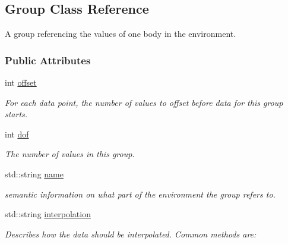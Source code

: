 \hypertarget{classOpenRAVE_1_1ConfigurationSpecification_1_1Group}{
\subsection{Group Class Reference}
\label{classOpenRAVE_1_1ConfigurationSpecification_1_1Group}
}


A group referencing the values of one body in the environment.  


\subsubsection*{Public Attributes}
\begin{DoxyCompactItemize}
\item 
\hypertarget{classOpenRAVE_1_1ConfigurationSpecification_1_1Group_aed7ea92f45bd273dde380a45ddced592}{
int \hyperlink{classOpenRAVE_1_1ConfigurationSpecification_1_1Group_aed7ea92f45bd273dde380a45ddced592}{offset}}
\label{classOpenRAVE_1_1ConfigurationSpecification_1_1Group_aed7ea92f45bd273dde380a45ddced592}

\begin{DoxyCompactList}\small\item\em For each data point, the number of values to offset before data for this group starts. \item\end{DoxyCompactList}\item 
\hypertarget{classOpenRAVE_1_1ConfigurationSpecification_1_1Group_a03745287ca42590ead4a18807041fc66}{
int \hyperlink{classOpenRAVE_1_1ConfigurationSpecification_1_1Group_a03745287ca42590ead4a18807041fc66}{dof}}
\label{classOpenRAVE_1_1ConfigurationSpecification_1_1Group_a03745287ca42590ead4a18807041fc66}

\begin{DoxyCompactList}\small\item\em The number of values in this group. \item\end{DoxyCompactList}\item 
std::string \hyperlink{classOpenRAVE_1_1ConfigurationSpecification_1_1Group_a9b45b3e13bd9167aab02e17e08916231}{name}
\begin{DoxyCompactList}\small\item\em semantic information on what part of the environment the group refers to. \item\end{DoxyCompactList}\item 
std::string \hyperlink{classOpenRAVE_1_1ConfigurationSpecification_1_1Group_ac5505c39cf473d93d9ef8690d181d007}{interpolation}
\begin{DoxyCompactList}\small\item\em Describes how the data should be interpolated. Common methods are: \item\end{DoxyCompactList}\end{DoxyCompactItemize}


